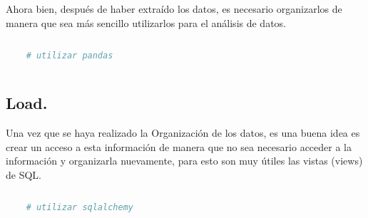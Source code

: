 \documentclass[12pt]{article}
\begin{document}
Ahora bien, después de haber extraído los datos, es necesario organizarlos de manera que sea más sencillo utilizarlos para el análisis de datos.

\vspace{12pt}
\begin{lstlisting}[language=Python]
    
    # utilizar pandas
    
\end{lstlisting}
\vspace{12pt}

\subsection{Load.}

Una vez que se haya realizado la Organización de los datos, es una buena idea es crear un acceso a esta información de manera que no sea necesario acceder a la información y organizarla nuevamente, para esto son muy útiles las vistas (views) de SQL.

\vspace{12pt}
\begin{lstlisting}[language=Python]
    
    # utilizar sqlalchemy
    
\end{lstlisting}
\vspace{12pt}
\end{document}
